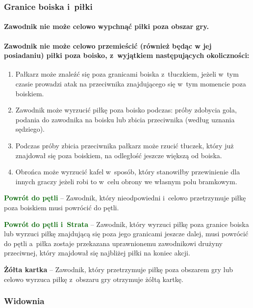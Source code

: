 \documentclass[12pt,a4paper]{article}
\newcommand\yellowcard[1]{\bgroup\textcolor{darkyellow}{\textbf{#1}}}
\newcommand\other[1]{\bgroup\textcolor{darkgreen}{\textbf{#1}}}
\begin{document}
\subsubsection{Granice boiska i~piłki}

\paragraph{Zawodnik nie może celowo wypchnąć piłki poza obszar gry.}

\paragraph{Zawodnik nie może celowo przemieścić (również będąc w jej posiadaniu) piłki poza boisko, z~wyjątkiem następujących okoliczności:}

\begin{enumerate}
	\item
	      Pałkarz może znaleźć się poza granicami boiska z~tłuczkiem, jeżeli w~tym czasie prowadzi atak na przeciwnika znajdującego się w~tym
	      momencie poza boiskiem.
	\item
	      Zawodnik może wyrzucić piłkę poza boisko podczas: próby zdobycia gola,
	      podania do zawodnika na boisku lub zbicia przeciwnika (według uznania
	      sędziego).
	\item
	      Podczas próby zbicia przeciwnika pałkarz może rzucić tłuczek, który
	      już znajdował się poza boiskiem, na odległość jeszcze większą od
	      boiska.
	\item
	      Obrońca może wyrzucić kafel w~sposób, który stanowiłby przewinienie
	      dla innych graczy jeżeli robi to w~celu obrony we własnym polu
	      bramkowym.
\end{enumerate}

\other{Powrót do pętli} -- Zawodnik, który nieodpowiedni i~celowo
przetrzymuje piłkę poza boiskiem musi powrócić do pętli.

\other{Powrót do pętli i~Strata} -- Zawodnik, który wyrzuci piłkę poza
granice boiska lub wyrzuci piłkę znajdującą się poza jego granicami
jeszcze dalej, musi powrócić do pętli a~piłka zostaje przekazana
uprawnionemu zawodnikowi drużyny przeciwnej, który znajdował się
najbliżej piłki na koniec akcji.

\yellowcard{Żółta kartka} -- Zawodnik, który przetrzymuje piłkę poza obszarem
gry lub celowo wyrzuca piłkę z~obszaru gry otrzymuje żółtą kartkę.

\subsubsection{Widownia}
\end{document}
